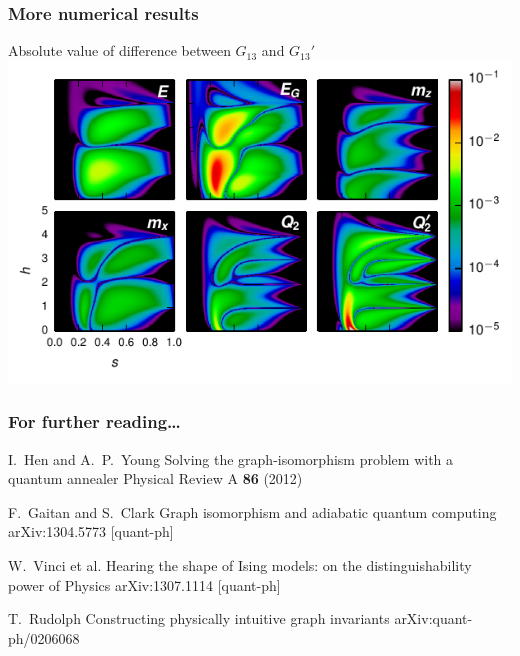 \documentclass{beamer}
\begin{document}
\begin{frame}
  \frametitle{More numerical results}
  \begin{center}
    Absolute value of difference between $G_{13}$ and $G_{13}'$
    \includegraphics{delta-grid}
  \end{center}
\end{frame}

\begin{frame}
  \frametitle{For further reading\ldots}
    
  \begin{thebibliography}{10}
    
  \beamertemplatearticlebibitems

    I.~Hen and A.~P.~Young
    \newblock Solving the graph-isomorphism problem with a quantum annealer
    \newblock Physical Review A {\bf 86} (2012)
    
    F.~Gaitan and S.~Clark
    \newblock Graph isomorphism and adiabatic quantum computing
    \newblock arXiv:1304.5773 [quant-ph]

    W.~Vinci et al.
    \newblock Hearing the shape of Ising models: on the distinguishability
    power of Physics
    \newblock arXiv:1307.1114 [quant-ph]

    T.~Rudolph
    \newblock Constructing physically intuitive graph invariants
    \newblock arXiv:quant-ph/0206068
  \end{thebibliography}
\end{frame}
\end{document}
